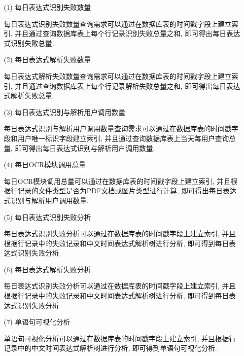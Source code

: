 \begin{enumerate}
  \item[(1)] 每日表达式识别失败数量

    每日表达式识别失败数量查询需求可以通过在数据库表的时间戳字段上建立索引, 并且通过查询数据库表上每个行记录识别失败总量之和, 即可得出每日表达式识别失败总量.

  \item[(2)] 每日表达式解析失败数量

    每日表达式解析失败数量查询需求可以通过在数据库表的时间戳字段上建立索引, 并且通过查询数据库表上每个行记录解析失败总量之和, 即可得出每日表达式解析失败总量.

  \item[(3)] 每日表达式识别与解析用户调用数量

    每日表达式识别与解析用户调用数量查询需求可以通过在数据库表的时间戳字段和用户唯一标识字段建立索引, 并且通过查询数据库表上当天每用户查询总量, 即可得出每日表达式识别与解析用户调用数量.

  \item[(4)] 每日OCR模块调用总量

    每日OCR模块调用总量可以通过在数据库表的时间戳字段上建立索引, 并且根据行记录的文件类型是否为PDF文档或图片类型进行计算, 即可得出每日表达式识别与解析用户调用数量.

  \item[(5)] 每日表达式识别失败分析

    每日表达式识别失败分析可以通过在数据库表的时间戳字段上建立索引, 并且根据行记录中的失败记录和中文时间表达式解析树进行分析, 即可得到每日表达式识别失败分析.

  \item[(6)] 每日表达式解析失败分析

    每日表达式识别失败分析可以通过在数据库表的时间戳字段上建立索引, 并且根据行记录中的失败记录和中文时间表达式解析树进行分析, 即可得到每日表达式识别失败分析.

  \item[(7)] 单语句可视化分析

    单语句可视化分析可以通过在数据库表的时间戳字段上建立索引, 并且根据行记录中的中文时间表达式解析树进行分析, 即可得到单语句可视化分析.
\end{enumerate}

